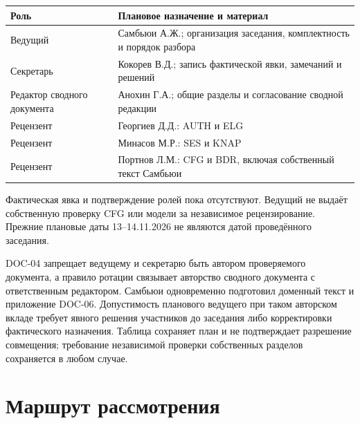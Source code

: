 \documentclass[12pt,a4paper]{article}
\newcounter{none} %
\begin{document}
{\def\LTcaptype{none} %
\begin{longtable}[]{@{}
  >{\raggedright\arraybackslash}p{}
  >{\raggedright\arraybackslash}p{}@{}}
\toprule\noalign{}
\begin{minipage}[b]{\linewidth}\raggedright
Роль
\end{minipage} & \begin{minipage}[b]{\linewidth}\raggedright
Плановое назначение и материал
\end{minipage} \\
\midrule\noalign{}
\endhead
\bottomrule\noalign{}
\endlastfoot
Ведущий & Самбьюи А.Ж.; организация заседания, комплектность и порядок разбора \\
Секретарь & Кокорев В.Д.; запись фактической явки, замечаний и решений \\
Редактор сводного документа & Анохин Г.А.; общие разделы и согласование сводной редакции \\
Рецензент & Георгиев Д.Д.: AUTH и ELG \\
Рецензент & Минасов М.Р.: SES и KNAP \\
Рецензент & Портнов Л.М.: CFG и BDR, включая собственный текст Самбьюи \\
\end{longtable}
}

Фактическая явка и подтверждение ролей пока отсутствуют. Ведущий не выдаёт собственную проверку CFG или модели за независимое рецензирование. Прежние плановые даты 13--14.11.2026 не являются датой проведённого заседания.

DOC-04 запрещает ведущему и секретарю быть автором проверяемого документа, а правило ротации связывает авторство сводного документа с ответственным редактором. Самбьюи одновременно подготовил доменный текст и приложение DOC-06. Допустимость планового ведущего при таком авторском вкладе требует явного решения участников до заседания либо корректировки фактического назначения. Таблица сохраняет план и не подтверждает разрешение совмещения; требование независимой проверки собственных разделов сохраняется в любом случае.

\section{Маршрут рассмотрения}\label{ux43cux430ux440ux448ux440ux443ux442-ux440ux430ux441ux441ux43cux43eux442ux440ux435ux43dux438ux44f}
\end{document}
